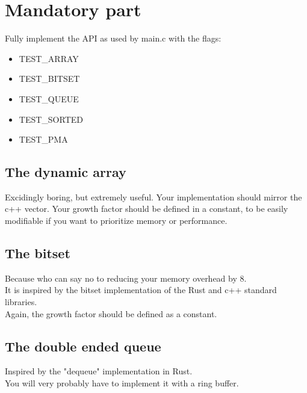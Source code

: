 \documentclass{42-en}
\begin{document}
\chapter{Mandatory part}

    Fully implement the API as used by main.c with the flags:\\

    \begin{itemize}\itemsep7pt
        \item TEST_ARRAY
        \item TEST_BITSET
        \item TEST_QUEUE
        \item TEST_SORTED
        \item TEST_PMA
    \end{itemize}

    \section{The dynamic array}
    Excidingly boring, but extremely useful.
    Your implementation should mirror the c++ vector. Your growth factor should
    be defined in a constant, to be easily modifiable if you want to prioritize
    memory or performance.

    \section{The bitset}
    Because who can say no to reducing your memory overhead by 8.\\
    It is inspired by the bitset implementation of the Rust and c++ standard libraries.\\
    Again, the growth factor should be defined as a constant.

    \section{The double ended queue}
    Inspired by the "dequeue" implementation in Rust.\\
    You will very probably have to implement it with a ring buffer.\\
\end{document}
